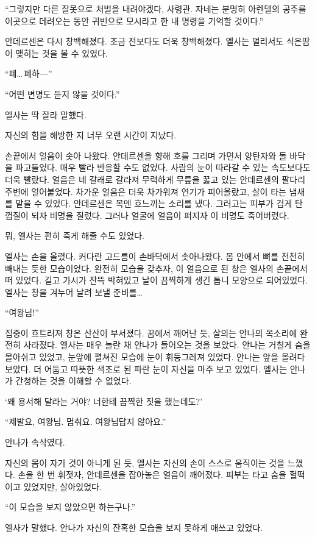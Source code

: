 ``그렇지만 다른 잘못으로 처벌을 내려야겠다, 사령관. 자네는 분명히 아렌델의 공주를 이곳으로 데려오는 동안 귀빈으로 모시라고 한 내 명령을 기억할 것이다.''

안데르센은 다시 창백해졌다. 조금 전보다도 더욱 창백해졌다. 엘사는 멀리서도 식은땀이 맺히는 것을 볼 수 있었다.

``폐\ldots\,폐하—''

``어떤 변명도 듣지 않을 것이다.''

엘사는 딱 잘라 말했다.

자신의 힘을 해방한 지 너무 오랜 시간이 지났다.

손끝에서 얼음이 솟아 나왔다. 안데르센을 향해 호를 그리며 가면서 양탄자와 돌 바닥을 파고들었다. 매우 빨라 반응할 수도 없었다. 사람의 눈이 따라갈 수 있는 속도보다도 더욱 빨랐다. 얼음은 네 갈래로 갈라져 무력하게 무릎을 꿇고 있는 안데르센의 팔다리 주변에 얼어붙었다. 차가운 얼음은 더욱 차가워져 연기가 피어올랐고, 살이 타는 냄새를 맡을 수 있었다. 안데르센은 목멘 흐느끼는 소리를 냈다. 그러고는 피부가 검게 탄 껍질이 되자 비명을 질렀다. 그러나 얼굴에 얼음이 퍼지자 이 비명도 죽어버렸다.

뭐, 엘사는 편히 죽게 해줄 수도 있었다.

엘사는 손을 올렸다. 커다란 고드름이 손바닥에서 솟아나왔다. 몸 안에서 뼈를 천천히 빼내는 듯한 모습이었다. 완전히 모습을 갖추자, 이 얼음으로 된 창은 엘사의 손끝에서 떠 있었다. 길고 가시가 잔뜩 박혀있고 날이 끔찍하게 생긴 톱니 모양으로 되어있었다. 엘사는 창을 겨누어 날려 보낼 준비를\ldots

``여왕님!''

집중이 흐트러져 창은 산산이 부서졌다. 꿈에서 깨어난 듯, 살의는 안나의 목소리에 완전히 사라졌다. 엘사는 매우 놀란 채 안나가 들어오는 것을 보았다. 안나는 거칠게 숨을 몰아쉬고 있었고, 눈앞에 펼쳐진 모습에 눈이 휘둥그레져 있었다. 안나는 앞을 올려다보았다. 더 어둡고 따뜻한 색조로 된 파란 눈이 자신을 마주 보고 있었다. 엘사는 안나가 간청하는 것을 이해할 수 없었다.

`왜 용서해 달라는 거야? 너한테 끔찍한 짓을 했는데도?'

``제발요, 여왕님. 멈춰요. 여왕님답지 않아요.''

안나가 속삭였다.

자신의 몸이 자기 것이 아니게 된 듯, 엘사는 자신의 손이 스스로 움직이는 것을 느꼈다. 손을 한 번 휘젓자, 안데르센을 잡아놓은 얼음이 깨어졌다. 피부는 타고 숨을 헐떡이고 있었지만, 살아있었다.

``이 모습을 보지 않았으면 하는구나.''

엘사가 말했다. 안나가 자신의 잔혹한 모습을 보지 못하게 애쓰고 있었다.

